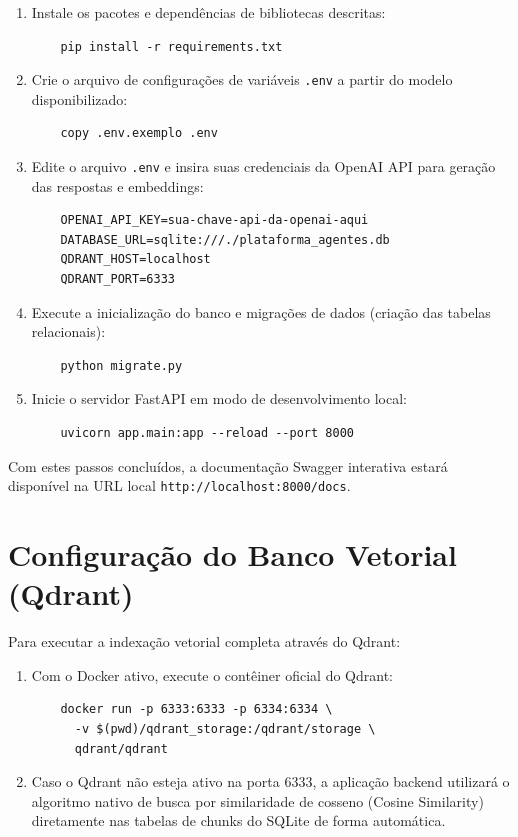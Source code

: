 \documentclass[12pt, openright, oneside, a4paper, brazil]{ads-unipac-abntex2}
\begin{document}
\begin{anexosenv}
\begin{enumerate}
    \item Instale os pacotes e dependências de bibliotecas descritas:
    \begin{verbatim}
    pip install -r requirements.txt
    \end{verbatim}
    
    \item Crie o arquivo de configurações de variáveis \verb|.env| a partir do modelo disponibilizado:
    \begin{verbatim}
    copy .env.exemplo .env
    \end{verbatim}
    
    \item Edite o arquivo \verb|.env| e insira suas credenciais da OpenAI API para geração das respostas e embeddings:
    \begin{verbatim}
    OPENAI_API_KEY=sua-chave-api-da-openai-aqui
    DATABASE_URL=sqlite:///./plataforma_agentes.db
    QDRANT_HOST=localhost
    QDRANT_PORT=6333
    \end{verbatim}
    
    \item Execute a inicialização do banco e migrações de dados (criação das tabelas relacionais):
    \begin{verbatim}
    python migrate.py
    \end{verbatim}
    
    \item Inicie o servidor FastAPI em modo de desenvolvimento local:
    \begin{verbatim}
    uvicorn app.main:app --reload --port 8000
    \end{verbatim}
\end{enumerate}
Com estes passos concluídos, a documentação Swagger interativa estará disponível na URL local \verb|http://localhost:8000/docs|.

\section{Configuração do Banco Vetorial (Qdrant)}
Para executar a indexação vetorial completa através do Qdrant:
\begin{enumerate}
    \item Com o Docker ativo, execute o contêiner oficial do Qdrant:
    \begin{verbatim}
    docker run -p 6333:6333 -p 6334:6334 \
      -v $(pwd)/qdrant_storage:/qdrant/storage \
      qdrant/qdrant
    \end{verbatim}
    \item Caso o Qdrant não esteja ativo na porta 6333, a aplicação backend utilizará o algoritmo nativo de busca por similaridade de cosseno (Cosine Similarity) diretamente nas tabelas de chunks do SQLite de forma automática.
\end{enumerate}


\end{anexosenv}
\end{document}
